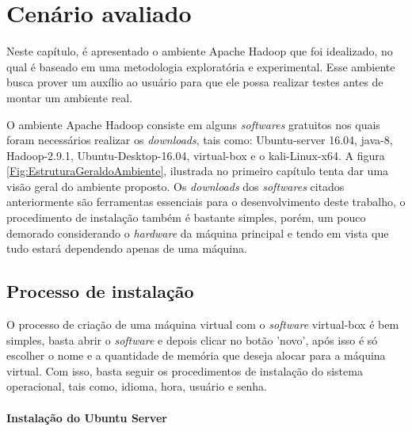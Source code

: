 \chapter{Cenário avaliado}
\label{CAP4}

Neste capítulo, é apresentado o ambiente Apache Hadoop que foi idealizado, no qual é baseado em uma metodologia exploratória e experimental. Esse ambiente busca prover um auxílio ao usuário para que ele possa realizar testes antes de montar um ambiente real.

O ambiente Apache Hadoop consiste em alguns \textit{softwares} gratuitos nos quais foram necessários realizar os \textit{downloads}, tais como: Ubuntu-server 16.04, java-8, Hadoop-2.9.1, Ubuntu-Desktop-16.04, virtual-box e o kali-Linux-x64. A figura \ref{Fig:EstruturaGeraldoAmbiente}, ilustrada no primeiro capítulo tenta dar uma visão geral do ambiente proposto. Os \textit{downloads} dos \textit{softwares} citados anteriormente são ferramentas essenciais para o desenvolvimento deste trabalho, o procedimento de instalação também é bastante simples, porém, um pouco demorado considerando o \textit{hardware} da máquina principal e tendo em vista que tudo estará dependendo apenas de uma máquina.

\section{Processo de instalação}

O processo de criação de uma máquina virtual com o \textit{software} virtual-box é bem simples, basta abrir o \textit{software} e depois clicar no botão 'novo', após isso é só escolher o nome e a quantidade de memória que deseja alocar para a máquina virtual. Com isso, basta seguir os procedimentos de instalação do sistema operacional, tais como, idioma, hora, usuário e senha.

\subsubsection{Instalação do Ubuntu Server}

